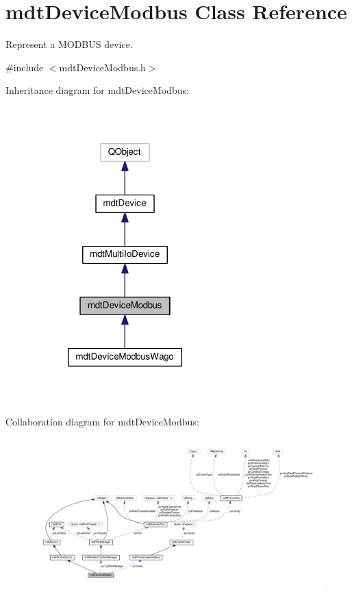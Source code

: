 \hypertarget{classmdt_device_modbus}{\section{mdt\-Device\-Modbus Class Reference}
\label{classmdt_device_modbus}
}


Represent a M\-O\-D\-B\-U\-S device.  




{\ttfamily \#include $<$mdt\-Device\-Modbus.\-h$>$}



Inheritance diagram for mdt\-Device\-Modbus\-:
\nopagebreak
\begin{figure}[H]
\begin{center}
\leavevmode
\includegraphics[width=202pt]{classmdt_device_modbus__inherit__graph}
\end{center}
\end{figure}


Collaboration diagram for mdt\-Device\-Modbus\-:
\nopagebreak
\begin{figure}[H]
\begin{center}
\leavevmode
\includegraphics[width=350pt]{classmdt_device_modbus__coll__graph}
\end{center}
\end{figure}
